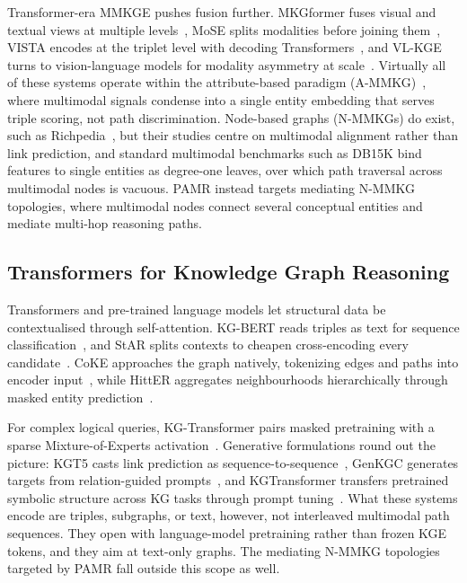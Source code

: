 \documentclass[runningheads]{llncs}
\begin{document}
Transformer-era MMKGE pushes fusion further. MKGformer fuses visual and textual views at multiple levels~\cite{chen2022mkgformer}, MoSE splits modalities before joining them~\cite{zhao2022mose}, VISTA encodes at the triplet level with decoding Transformers~\cite{lee2023vista}, and VL-KGE turns to vision-language models for modality asymmetry at scale~\cite{efthymiou2026vlkge}. Virtually all of these systems operate within the attribute-based paradigm (A-MMKG)~\cite{zhu2024multimodal}, where
multimodal signals condense into a single entity embedding that serves triple scoring, not path discrimination. Node-based graphs (N-MMKGs) do exist, such as Richpedia~\cite{wang2020richpedia}, but their studies centre on multimodal alignment rather than link prediction, and standard multimodal benchmarks such as DB15K bind features to single entities as degree-one leaves, over which path traversal across multimodal nodes is vacuous. PAMR instead targets mediating N-MMKG topologies, where multimodal nodes connect several conceptual entities and mediate multi-hop reasoning paths.

\subsection{Transformers for Knowledge Graph Reasoning}
\label{sec:rw-transformers}

Transformers and pre-trained language models let structural data be contextualised through self-attention. KG-BERT reads triples as text for sequence classification~\cite{yao2019kg}, and StAR splits contexts to cheapen cross-encoding every candidate~\cite{wang2021star}. CoKE approaches the graph natively, tokenizing edges and paths into encoder input~\cite{wang2019coke}, while HittER aggregates neighbourhoods hierarchically through masked entity prediction~\cite{chen2021hitter}.

For complex logical queries, KG-Transformer pairs masked pretraining with a sparse Mixture-of-Experts activation~\cite{liu2022mask}. Generative formulations round out the picture: KGT5 casts link prediction as sequence-to-sequence~\cite{saxena2022kgt5}, GenKGC generates targets from relation-guided prompts~\cite{zhu2022genkgc}, and KGTransformer transfers pretrained symbolic structure across KG tasks through prompt tuning~\cite{zhang2023kgtransformer}. What these systems encode are triples, subgraphs, or text, however, not interleaved multimodal path sequences. They open with language-model pretraining rather than frozen KGE tokens, and they aim at text-only graphs. The mediating N-MMKG topologies targeted by PAMR fall outside this scope as well.
\end{document}
